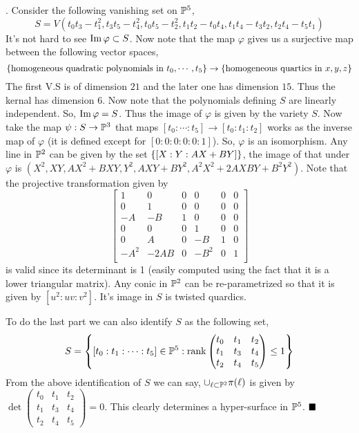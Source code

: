 \documentclass[12pt]{article}
\begin{document}
\sol. Consider the following vanishing set on $\mathbb{P}^5$, $$S = V(t_0t_3-t_1^2, t_3t_5-t_4^2,t_0t_5-t_2^2,t_1t_2-t_0t_4,t_1t_4-t_3t_2,t_2t_4-t_5t_1)$$
It's not hard to see $\operatorname{Im} \varphi \subset S$. Now note that the map $\varphi$ gives us a surjective map between the following vector spaces, \[
    \qty{\text{homogeneous quadratic polynomials in }t_0,\cdots,t_5} \to  \qty{\text{homogeneous quartics in } x,y,z}
\]
The first V.S is of dimension $21$ and the later one has dimension $15$. Thus the kernal has dimension $6$. Now note that the polynomials defining $S$ are linearly independent. So, $\operatorname{Im} \varphi = S$. Thus the image of $\varphi$ is given by the variety $S$. Now take the map $\psi : S \to \mathbb{P}^3$ that maps $[t_0:\cdots:t_5] \to [t_0:t_1:t_2]$ works as the inverse map of $\varphi$ (it is defined except for $[0:0:0:0:0:1]$). So, $\varphi$ is an isomorphism.  Any line in $\mathbb{P}^2$ can be given by the set $\qty{[X:Y:AX+BY]}$, the image of that under $\varphi$ is $(X^2, XY, AX^2+BXY, Y^2, AXY + BY^2, A^2X^2 + 2AXBY + B^2Y^2)$. Note that the projective transformation given by
\[
    \begin{bmatrix}
        1    & 0    & 0 & 0    & 0 & 0 \\
        0    & 1    & 0 & 0    & 0 & 0 \\
        -A   & -B   & 1 & 0    & 0 & 0 \\
        0    & 0    & 0 & 1    & 0 & 0 \\
        0    & A    & 0 & -B   & 1 & 0 \\
        -A^2 & -2AB & 0 & -B^2 & 0 & 1 \\
    \end{bmatrix}
\]
is valid since its determinant is 1 (easily computed using the fact that it is a lower triangular matrix). Any conic in $\mathbb{P}^2$ can be re-parametrized so that it is given by $[u^2:uv:v^2]$. It's image in $S$ is twisted quardics.
\vspace*{0.2cm}

\noindent To do the last part we can also identify $S$ as the following set,\[S = \qty{ [t_0:t_1:\cdots:t_5] \in \mathbb{P}^5:\operatorname{rank }\begin{pmatrix}
            t_0 & t_1 & t_2 \\
            t_1 & t_3 & t_4 \\
            t_2 & t_4 & t_5
        \end{pmatrix} \leq 1}\] From the above identification of $S$ we can say, $\cup_{\ell \subset \mathbb{P}^2}\pi(\ell)$ is given by $\det \begin{pmatrix}
        t_0 & t_1 & t_2 \\
        t_1 & t_3 & t_4 \\
        t_2 & t_4 & t_5
    \end{pmatrix}=0$. This clearly determines a hyper-surface in $\mathbb{P}^5$. $\hfill \blacksquare$
\end{document}
